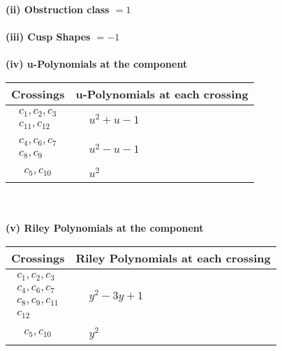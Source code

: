 \documentclass[1p]{elsarticle_modified}
\theoremstyle{definition}
\begin{document}
\flushleft \textbf{(ii) Obstruction class $= 1$}\\~\\
\flushleft \textbf{(iii) Cusp Shapes $= -1$}\\~\\
\newpage\renewcommand{\arraystretch}{1}
\flushleft \textbf{(iv) u-Polynomials at the component}\newline \\
\begin{tabular}{m{50pt}|m{274pt}}
Crossings & \hspace{64pt}u-Polynomials at each crossing \\
\hline $$\begin{aligned}c_{1},c_{2},c_{3}\\c_{11},c_{12}\end{aligned}$$&$\begin{aligned}
&u^2+u-1
\end{aligned}$\\
\hline $$\begin{aligned}c_{4},c_{6},c_{7}\\c_{8},c_{9}\end{aligned}$$&$\begin{aligned}
&u^2- u-1
\end{aligned}$\\
\hline $$\begin{aligned}c_{5},c_{10}\end{aligned}$$&$\begin{aligned}
&u^2
\end{aligned}$\\
\hline
\end{tabular}\\~\\
\newpage\renewcommand{\arraystretch}{1}
\flushleft \textbf{(v) Riley Polynomials at the component}\newline \\
\begin{tabular}{m{50pt}|m{274pt}}
Crossings & \hspace{64pt}Riley Polynomials at each crossing \\
\hline $$\begin{aligned}c_{1},c_{2},c_{3}\\c_{4},c_{6},c_{7}\\c_{8},c_{9},c_{11}\\c_{12}\end{aligned}$$&$\begin{aligned}
&y^2-3 y+1
\end{aligned}$\\
\hline $$\begin{aligned}c_{5},c_{10}\end{aligned}$$&$\begin{aligned}
&y^2
\end{aligned}$\\
\hline
\end{tabular}\\~\\
\end{document}
